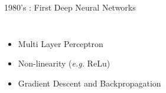 \documentclass{irdbeamer}
\let\oldcite=\cite
\renewcommand{\cite}[1]{\textcolor[rgb]{.5,.5,.7}{\oldcite{#1}}}
\begin{document}
\begin{frame}[t]{1980's : First Deep Neural Networks}
\begin{columns}[t]
    \vspace{1cm}
    \begin{itemize}
        \item<1-> Multi Layer Perceptron
        \item<2-> Non-linearity (\textit{e.g.} ReLu)
        \item<3-> Gradient Descent and Backpropagation\\ \cite{rumelhart1986learning}
    \end{itemize}
\end{columns}
\end{frame}
\end{document}
